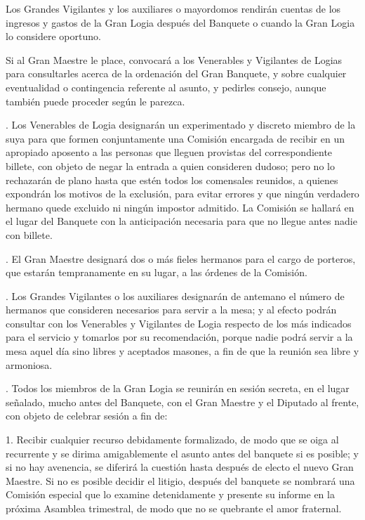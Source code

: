 \documentclass[a4paper,12pt,twoside]{book}
\begin{document}
\noindent Los Grandes Vigilantes y los auxiliares o mayordomos rendirán cuentas de los ingresos y gastos de la Gran Logia después del Banquete o cuando la Gran Logia lo considere oportuno.

\noindent Si al Gran Maestre le place, convocará a los Venerables y Vigilantes de Logias para consultarles acerca de la ordenación del Gran Banquete, y sobre cualquier eventualidad o contingencia referente al asunto, y pedirles consejo, aunque también puede proceder según le parezca.

\vspace{0.3cm}

. Los Venerables de Logia designarán un experimentado y discreto miembro de la suya para que formen conjuntamente una Comisión encargada de recibir en un apropiado aposento a las personas que lleguen provistas del correspondiente billete, con objeto de negar la entrada a quien consideren dudoso; pero no lo rechazarán de plano hasta que estén todos los comensales reunidos, a quienes expondrán los motivos de la exclusión, para evitar errores y que ningún verdadero hermano quede excluido ni ningún impostor admitido. La Comisión se hallará en el lugar del Banquete con la anticipación necesaria para que no llegue antes nadie con billete.

\vspace{0.3cm}

. El Gran Maestre designará dos o más fieles hermanos para el cargo de porteros, que estarán tempranamente en su lugar, a las órdenes de la Comisión.

\vspace{0.3cm}

. Los Grandes Vigilantes o los auxiliares designarán de antemano el número de hermanos que consideren necesarios para servir a la mesa; y al efecto podrán consultar con los Venerables y Vigilantes de Logia respecto de los más indicados para el servicio y tomarlos por su recomendación, porque nadie podrá servir a la mesa aquel día sino libres y aceptados masones, a fin de que la reunión sea libre y armoniosa.

\vspace{0.3cm}

. Todos los miembros de la Gran Logia se reunirán en sesión secreta, en el lugar señalado, mucho antes del Banquete, con el Gran Maestre y el Diputado al frente, con objeto de celebrar sesión a fin de:

1. Recibir cualquier recurso debidamente formalizado, de modo que se oiga al recurrente y se dirima amigablemente el asunto antes del banquete si es posible; y si no hay avenencia, se diferirá la cuestión hasta después de electo el nuevo Gran Maestre. Si no es posible decidir el litigio, después del banquete se nombrará una Comisión especial que lo examine detenidamente y presente su informe en la próxima Asamblea trimestral, de modo que no se quebrante el amor fraternal.
\end{document}
